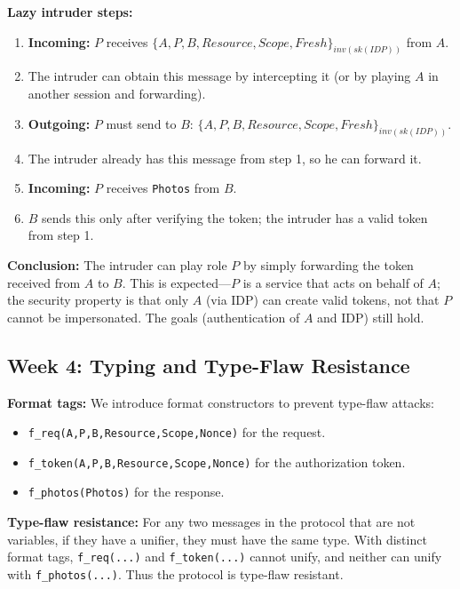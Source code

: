 \documentclass[11pt,a4paper]{article}
\begin{document}
\textbf{Lazy intruder steps:}
\begin{enumerate}
  \item \textbf{Incoming:} $P$ receives $\{A, P, B, \mathit{Resource}, \mathit{Scope}, \mathit{Fresh}\}_{\mathit{inv}(\mathit{sk}(\mathit{IDP}))}$ from $A$.
  \item The intruder can obtain this message by intercepting it (or by playing $A$ in another session and forwarding).
  \item \textbf{Outgoing:} $P$ must send to $B$: $\{A, P, B, \mathit{Resource}, \mathit{Scope}, \mathit{Fresh}\}_{\mathit{inv}(\mathit{sk}(\mathit{IDP}))}$.
  \item The intruder already has this message from step 1, so he can forward it.
  \item \textbf{Incoming:} $P$ receives \texttt{Photos} from $B$.
  \item $B$ sends this only after verifying the token; the intruder has a valid token from step 1.
\end{enumerate}

\textbf{Conclusion:} The intruder can play role $P$ by simply forwarding the token received from $A$ to $B$. This is expected---$P$ is a service that acts on behalf of $A$; the security property is that only $A$ (via IDP) can create valid tokens, not that $P$ cannot be impersonated. The goals (authentication of $A$ and IDP) still hold.

\subsection{Week 4: Typing and Type-Flaw Resistance}

\textbf{Format tags:} We introduce format constructors to prevent type-flaw attacks:
\begin{itemize}
  \item \texttt{f\_req(A,P,B,Resource,Scope,Nonce)} for the request.
  \item \texttt{f\_token(A,P,B,Resource,Scope,Nonce)} for the authorization token.
  \item \texttt{f\_photos(Photos)} for the response.
\end{itemize}

\textbf{Type-flaw resistance:} For any two messages in the protocol that are not variables, if they have a unifier, they must have the same type. With distinct format tags, \texttt{f\_req(...)} and \texttt{f\_token(...)} cannot unify, and neither can unify with \texttt{f\_photos(...)}. Thus the protocol is type-flaw resistant.
\end{document}
